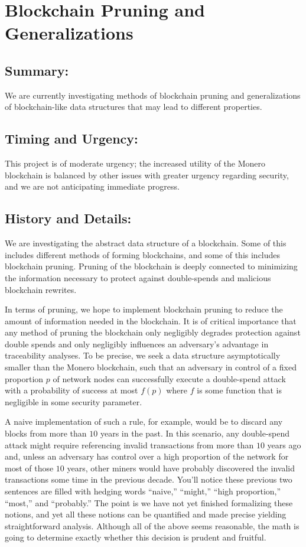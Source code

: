 \documentclass[12pt,english]{mrl}
\theoremstyle{definition}
\numberwithin{equation}{section}
\numberwithin{figure}{section}
\numberwithin{equation}{section}
\numberwithin{equation}{section}
\numberwithin{figure}{section}
\begin{document}
\section{Blockchain Pruning and Generalizations}

\subsection{Summary:} 

We are currently investigating methods of blockchain pruning and generalizations of blockchain-like data structures that may lead to different properties. 

\subsection{Timing and Urgency:} 

This project is of moderate urgency; the increased utility of the Monero blockchain is balanced by other issues with greater urgency regarding security, and we are not anticipating immediate progress.

\subsection{History and Details:} 

We are investigating the abstract data structure of a blockchain. Some of this includes different methods of forming blockchains, and some of this includes blockchain pruning. Pruning of the blockchain is deeply connected to minimizing the information necessary to protect against double-spends and malicious blockchain rewrites.

In terms of pruning, we hope to implement blockchain pruning to reduce the amount of information needed in the blockchain. It is of critical importance that any method of pruning the blockchain only negligibly degrades protection against double spends and only negligibly influences an adversary's advantage in traceability analyses. To be precise, we seek a data structure asymptotically smaller than the Monero blockchain, such that an adversary in control of a fixed proportion $p$ of network nodes can successfully execute a double-spend attack with a probability of success at most $f(p)$ where $f$ is some function that is negligible in some security parameter. 

A naive implementation of such a rule, for example, would be to discard any blocks from more than $10$ years in the past. In this scenario, any double-spend attack might require referencing invalid transactions from more than $10$ years ago and, unless an adversary has control over a high proportion of the network for most of those $10$ years, other miners would have probably discovered the invalid transactions some time in the previous decade. You'll notice these previous two sentences are filled with hedging words ``naive,'' ``might,'' ``high proportion,'' ``most,'' and ``probably.'' The point is we have not yet finished formalizing these notions, and yet all these notions can be quantified and made precise yielding straightforward analysis. Although all of the above seems reasonable, the math is going to determine exactly whether this decision is prudent and fruitful.
\end{document}
